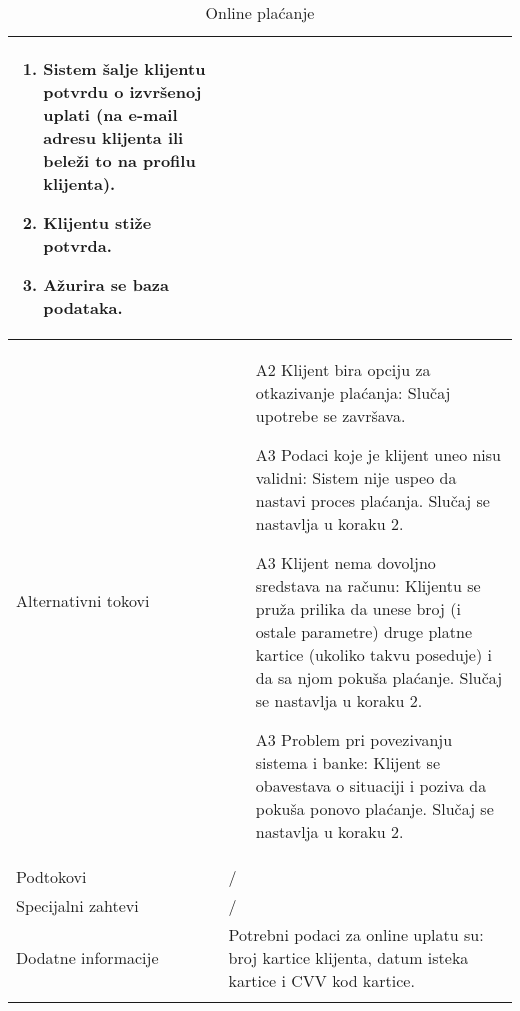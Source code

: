 \documentclass[../main.tex]{subfiles}
\begin{document}
\begin{longtable}{| p{} | p{} |}
\begin{enumerate}
        \item Sistem šalje klijentu potvrdu o izvršenoj uplati (na e-mail adresu klijenta ili beleži to na profilu klijenta).
        \item Klijentu stiže potvrda.
        \item Ažurira se baza podataka.
    \end{enumerate}\\
\hline
    Alternativni tokovi & \begin{enumerate}
       	    \item [A2] Klijent bira opciju za otkazivanje plaćanja: Slučaj upotrebe se završava.
        	\item [A3] Podaci koje je klijent uneo nisu validni: Sistem nije uspeo da nastavi proces plaćanja. Slučaj se nastavlja u koraku 2.
        	\item [A3] Klijent nema dovoljno sredstava na računu: Klijentu se pruža prilika da unese broj (i ostale parametre) druge platne kartice (ukoliko takvu poseduje) i da sa njom pokuša plaćanje. Slučaj se nastavlja u koraku 2. %
        	\item [A3] Problem pri povezivanju sistema i banke: Klijent se obavestava o situaciji i poziva da pokuša ponovo plaćanje. Slučaj se nastavlja u koraku 2.
            \end{enumerate}\\
\hline
    Podtokovi & / \\
\hline
    Specijalni zahtevi & / \\
\hline
    Dodatne informacije & Potrebni podaci za online uplatu su: broj kartice klijenta, datum isteka kartice i CVV kod kartice. \\
\hline
\caption{Online plaćanje} %
\label{tab:myfirstlongtable}
\end{longtable}

\end{document}
